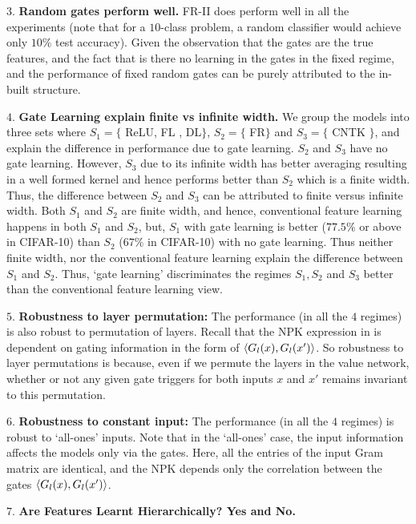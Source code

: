 \indent\quad $3.$ \textbf{Random gates perform well.} FR-II does perform well in all the experiments (note that for a $10$-class problem, a random classifier would achieve only $10\%$ test accuracy). Given the observation that the gates are the true features, and the fact that is there no learning in the gates in the fixed regime, and the performance of fixed random gates can be purely attributed to the in-built structure.

\indent\quad $4.$ \textbf{Gate Learning explain finite vs infinite width.} We group the models into three sets where $S_1=\{$ ReLU, FL , DL$\}$, $S_2=\{$ FR$\}$ and $S_3=\{$ CNTK $\}$, and explain the difference in performance due to gate learning.
 $S_2$ and $S_3$ have no gate learning. However,  $S_3$ due to its infinite width has better averaging resulting in a well formed kernel and hence performs better than $S_2$ which is a finite width. Thus, the difference between $S_2$ and $S_3$ can be attributed to finite versus infinite width. Both $S_1$ and $S_2$ are finite width, and hence, conventional feature learning happens in both $S_1$ and $S_2$, but, $S_1$ with gate learning is better ($77.5\%$ or above in CIFAR-10) than $S_2$ ($67\%$ in CIFAR-10) with no gate learning. Thus neither finite width, nor the conventional feature learning explain the difference between $S_1$ and $S_2$. Thus, `gate learning' discriminates the regimes $S_1, S_2$ and $S_3$ better than the conventional feature learning view.

\indent\quad $5.$ \textbf{Robustness to layer permutation:} The performance (in all the $4$ regimes) is also robust to permutation of layers. Recall that the NPK expression in  is dependent on gating information in the form of $\langle G_l(x),G_l(x')\rangle$. So robustness to layer permutations is because, even if we permute the layers in the value network, whether or not any given gate triggers for both inputs $x$ and $x'$ remains invariant to this permutation. 

\indent\quad $6.$ \textbf{Robustness to constant input:} The performance (in all the $4$ regimes) is  robust to `all-ones' inputs. Note that in the `all-ones' case, the input information affects the models only via the gates. Here, all the entries of the input Gram matrix are identical, and the NPK depends only the correlation between the gates $\langle G_l(x),G_l(x')\rangle$.

\indent\quad $7.$ \textbf{Are Features Learnt Hierarchically? Yes and No.}




